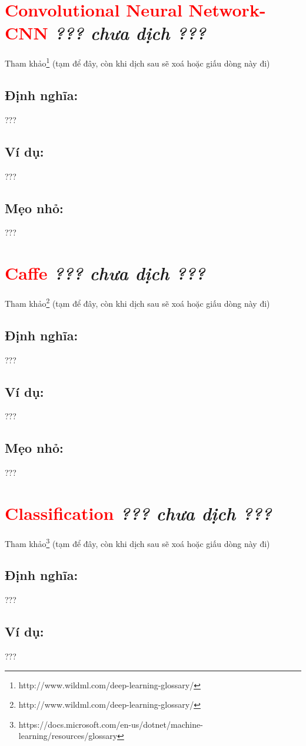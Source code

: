 \section*{\huge \textcolor{Red}{Convolutional Neural Network-CNN}  \small \textit{??? chưa dịch ???} }
Tham khảo\footnote{http://www.wildml.com/deep-learning-glossary/} (tạm để đây, còn khi dịch sau sẽ xoá hoặc giấu dòng này đi)
\subsection*{Định nghĩa:}
???
\subsection*{Ví dụ:}
???
\subsection*{Mẹo nhỏ:}
???
\section*{\huge \textcolor{Red}{Caffe}  \small \textit{??? chưa dịch ???} }
Tham khảo\footnote{http://www.wildml.com/deep-learning-glossary/} (tạm để đây, còn khi dịch sau sẽ xoá hoặc giấu dòng này đi)
\subsection*{Định nghĩa:}
???
\subsection*{Ví dụ:}
???
\subsection*{Mẹo nhỏ:}
???
\section*{\huge \textcolor{Red}{Classification}  \small \textit{??? chưa dịch ???} }
Tham khảo\footnote{https://docs.microsoft.com/en-us/dotnet/machine-learning/resources/glossary} (tạm để đây, còn khi dịch sau sẽ xoá hoặc giấu dòng này đi)
\subsection*{Định nghĩa:}
???
\subsection*{Ví dụ:}
???
